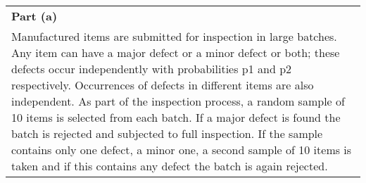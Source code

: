 \documentclass[a4paper,12pt]{article}
\begin{document}
\begin{table}[ht!]
     \centering
     \begin{tabular}{|p{15cm}|}
     \hline        
 \noindent \textbf{Part (a)}\\
Manufactured items are submitted for inspection in large batches.  Any item can have a major defect or a minor defect or both; these defects occur independently with probabilities p1 and p2 respectively.  Occurrences of defects in different items are also independent.  As part of the inspection process, a random sample of 10 items is selected from each batch.  If a major defect is found the batch is rejected and subjected to full inspection.  If the sample contains only one defect, a minor one, a second sample of 10 items is taken and if this contains any defect the batch is again rejected. 
\\ \hline
 \end{tabular}
\end{table}
\end{document}
